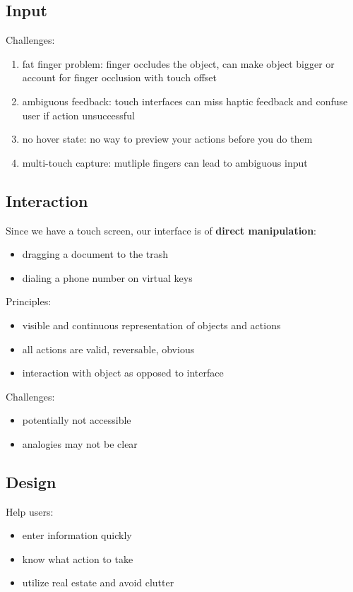 \documentclass[]{article}
\theoremstyle{definition}
\begin{document}
	\subsection{Input}
	Challenges:
	\begin{enumerate}
		\item fat finger problem: finger occludes the object, can make object bigger or account for finger occlusion with touch offset
		\item ambiguous feedback: touch interfaces can miss haptic feedback and confuse user if action unsuccessful
		\item no hover state: no way to preview your actions before you do them
		\item multi-touch capture: mutliple fingers can lead to ambiguous input
	\end{enumerate}

	\subsection{Interaction}
	Since we have a touch screen, our interface is of \textbf{direct manipulation}:
	\begin{itemize}
		\item dragging a document to the trash
		\item dialing a phone number on virtual keys
	\end{itemize}
	Principles:
	\begin{itemize}
		\item visible and continuous representation of objects and actions
		\item all actions are valid, reversable, obvious
		\item interaction with object as opposed to interface
	\end{itemize}
	Challenges:
	\begin{itemize}
		\item potentially not accessible
		\item analogies may not be clear
	\end{itemize}

	\subsection{Design}
	Help users:
	\begin{itemize}
		\item enter information quickly
		\item know what action to take
		\item utilize real estate and avoid clutter 
	\end{itemize}
\end{document}
